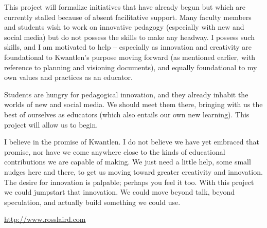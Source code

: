 \documentclass[10pt, letterpaper]{article}
\begin{document}
This project will formalize initiatives that have already begun but which are currently stalled because of absent facilitative support. Many faculty members and students wish to work on innovative pedagogy (especially with new and social media) but do not possess the skills to make any headway. I possess such skills, and I am motivated to help -- especially as innovation and creativity are foundational to Kwantlen's purpose moving forward (as mentioned earlier, with reference to planning and visioning documents), and equally foundational to my own values and practices as an educator.

Students are hungry for pedagogical innovation, and they already inhabit the worlds of new and social media. We should meet them there, bringing with us the best of ourselves as educators (which also entails our own new learning). This project will allow us to begin.

I believe in the promise of Kwantlen. I do not believe we have yet embraced that promise, nor have we come anywhere close to the kinds of educational contributions we are capable of making. We just need a little help, some small nudges here and there, to get us moving toward greater creativity and innovation. The desire for innovation is palpable; perhaps you feel it too. With this project we could jumpstart that innovation. We could move beyond talk, beyond speculation, and actually build something we could use.

\vfill{}
\hrulefill

\begin{center}
{\footnotesize \href{http://www.rosslaird.com}{http://www.rosslaird.com}\pmglyph{\Hibw}}
\end{center}
\end{document}
